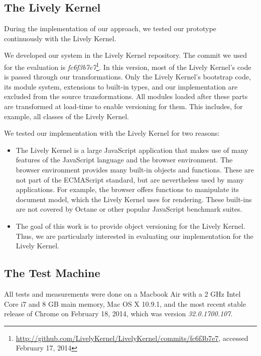 \subsection{The Lively Kernel}

During the implementation of our approach, we tested our prototype continuously with the Lively Kernel.

We developed our system in the Lively Kernel repository.
The commit we used for the evaluation is \emph{fc6f3b7e7}\footnote{\url{http://github.com/LivelyKernel/LivelyKernel/commits/fc6f3b7e7}, accessed February 17, 2014}. In this version, most of the Lively Kernel's code is passed through our transformations.
Only the Lively Kernel's bootstrap code, its module system, extensions to built-in types, and our implementation are excluded from the source transformations.
All modules loaded after these parts are transformed at load-time to enable versioning for them.
This includes, for example, all classes of the Lively Kernel.

We tested our implementation with the Lively Kernel for two reasons:

\begin{itemize}
    \item The Lively Kernel is a large JavaScript application that makes use of many features of the JavaScript language and the browser environment. The browser environment provides many built-in objects and functions. These are not part of the ECMAScript standard, but are nevertheless used by many applications. For example, the browser offers functions to manipulate its document model, which the Lively Kernel uses for rendering. These built-ins are not covered by Octane or other popular JavaScript benchmark suites. 
    \item The goal of this work is to provide object versioning for the Lively Kernel. Thus, we are particularly interested in evaluating our implementation for the Lively Kernel.
\end{itemize}


\subsection{The Test Machine}

All tests and measurements were done on a Macbook Air with a 2 GHz Intel Core i7 and 8 GB main memory, Mac OS X 10.9.1, and the most recent stable release of Chrome on February 18, 2014, which was version \emph{32.0.1700.107}.


